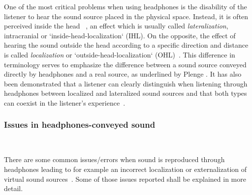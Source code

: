 \documentclass[journal]{IEEEtran}
\begin{document}
One of the most critical problems when using headphones is the disability of the listener to hear the sound source placed in the physical space. Instead, it is often perceived inside the head ~\cite{harma2004}, an effect which is usually called \emph{lateralization}, intracranial or `inside-head-localization` (IHL). On the opposite, the effect of hearing the sound outside the head according to a specific direction and distance is called \emph{localization} or `outside-head-localization` (OHL)~\cite{plenge1972}. This difference in terminology serves to emphasize the difference between a sound source conveyed directly by headphones and a real source, as underlined by Plenge \cite{plenge1972}. It has also been demonstrated that a listener can clearly distinguish when listening through headphones between localized and lateralized sound sources and that both types can coexist in the listener's experience~\cite{harma2004}.\\


\subsubsection*{Issues in headphones-conveyed sound}~

There are some common issues/errors when sound is reproduced through headphones leading to for example an incorrect localization or externalization of virtual sound sources~\cite{harma2004}. Some of those issues reported shall be explained in more detail.
\end{document}
